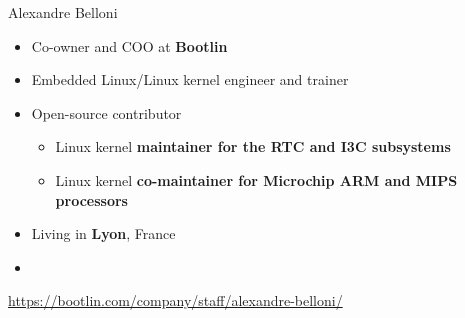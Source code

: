 \begin{frame}{Alexandre Belloni}
    \begin{itemize}
      \item Co-owner and COO at {\bf Bootlin}
      \item Embedded Linux/Linux kernel engineer and trainer
      \item Open-source contributor
        \begin{itemize}
          \item Linux kernel {\bf maintainer for the RTC and I3C subsystems}
          \item Linux kernel {\bf co-maintainer for Microchip ARM and
            MIPS processors}
        \end{itemize}
      \item Living in {\bf Lyon}, France
      \item {}
    \end{itemize}
    {\small \url{https://bootlin.com/company/staff/alexandre-belloni/}}
\end{frame}

